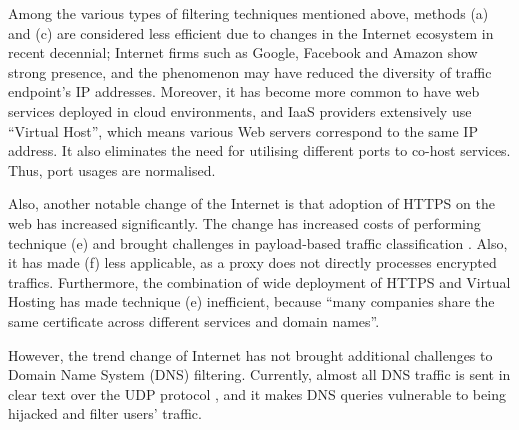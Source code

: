 \documentclass[a4paper,12pt]{article}
\begin{document}
Among the various types of filtering techniques mentioned above, methods (a) and (c) are considered less efficient due to changes in the Internet ecosystem in recent decennial;
Internet firms such as Google, Facebook and Amazon show strong presence\cite{haucap2014google}, and the phenomenon may have reduced the diversity of traffic endpoint's IP addresses.
Moreover, it has become more common to have web services deployed in cloud environments\cite{clouds2018stat}, and IaaS providers extensively use ``Virtual Host\cite{virtual24host}'', which means various Web servers correspond to the same IP address.
It also eliminates the need for utilising different ports to co-host services. Thus, port usages are normalised.

Also, another notable change of the Internet is that adoption of HTTPS on the web has increased significantly\cite{felt2017measuring}.
The change has increased costs of performing technique (e) and brought challenges in payload-based traffic classification \cite{xue2013traffic}.
Also, it has made (f) less applicable, as a proxy does not directly processes encrypted traffics\cite{shbair2015efficiently}.
Furthermore, the combination of wide deployment of HTTPS and Virtual Hosting has made technique (e) inefficient, because ``many companies share the same certificate across different services and domain names\cite{shbair2015efficiently}''.

However, the trend change of Internet has not brought additional challenges to Domain Name System (DNS) filtering. Currently, almost all DNS traffic is sent in clear text \cite{rfc7626} over the UDP protocol \cite{tcp2014analysis}, and it makes DNS queries vulnerable to being hijacked and filter users' traffic.
\end{document}
